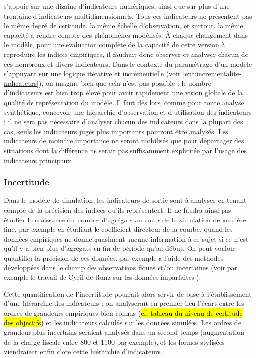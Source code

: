 \simfeodal{} s'appuie sur une dizaine d'indicateurs numériques, ainsi que sur plus d'une trentaine d'indicateurs multidimensionnels.
Tous ces indicateurs ne présentent pas le même degré de certitude, la même échelle d'observation, et surtout, la même capacité à rendre compte des phénomènes modélisés.
À chaque changement dans le modèle, pour une évaluation complète de la capacité de cette version à reproduire les indices empiriques, il faudrait donc observer et analyser chacun de ces nombreux et divers indicateurs.
Dans le contexte du paramétrage d'un modèle s'appuyant sur une logique itérative et incrémentielle (voir \cref{enc:incrementalite-indicateurs}), on imagine bien que cela n'est pas possible :
le nombre d'indicateurs est bien trop élevé pour avoir rapidement une vision globale de la qualité de représentation du modèle.
Il faut dès lors, comme pour toute analyse synthétique, concevoir une hiérarchie d'observation et d'utilisation des indicateurs :
il ne sera pas nécessaire d'analyser chacun des indicateurs dans la plupart des cas, seuls les indicateurs jugés plus importants pourront être analysés.
Les indicateurs de moindre importance ne seront mobilisés que pour départager des situations dont la différence ne serait pas suffisamment explicitée par l'usage des indicateurs principaux.

\subsubsection{Incertitude}\label{sssec:incertitude}
Dans le modèle de simulation, les indicateurs de sortie sont à analyser en tenant compte de la précision des indices qu'ils représentent.
Il ne faudra ainsi pas étudier la croissance du nombre d'agrégats au cours de la simulation de manière fine, par exemple en étudiant le coefficient directeur de la courbe, quand les données empiriques ne donne quasiment aucune information à ce sujet si ce n'est qu'il y a bien plus d'agrégats en fin de période qu'au début.
On peut vouloir quantifier la précision de ces données, par exemple à l'aide des méthodes développées dans le champ des observations floues et/ou incertaines (voir par exemple le travail de Cyril de Runz sur les données \og imparfaites\fg{} \autocite{de2008imperfection}).

Cette quantification de l'incertitude pourrait alors servir de base à l'établissement d'une hiérarchie des indicateurs :
on analyserait en premier lieu l'écart entre les ordres de grandeurs empiriques bien connus (\hl{cf. tableau du niveau de certitude des objectifs}) et les indicateurs calculés sur les données simulées.
Les ordres de grandeur plus incertains seraient analysés dans un second temps (augmentation de la charge fiscale entre 800 et 1100 par exemple), et les formes stylisées viendraient enfin clore cette hiérarchie d'indicateurs.

